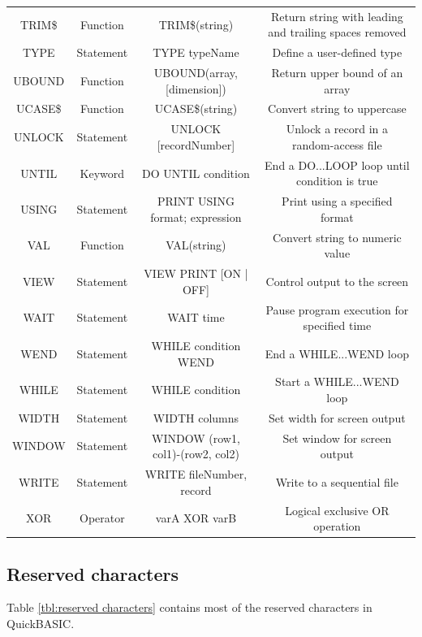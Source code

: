 \documentclass[10pt, reqno]{exam}
\begin{document}
{\begin{longtable}{|c|c|c|c|}
    TRIM\$ & Function & TRIM\$(string) & Return string with leading and trailing spaces removed \\
    TYPE & Statement & TYPE typeName & Define a user-defined type \\
    UBOUND & Function & UBOUND(array, [dimension]) & Return upper bound of an array \\
    UCASE\$ & Function & UCASE\$(string) & Convert string to uppercase \\
    UNLOCK & Statement & UNLOCK [recordNumber] & Unlock a record in a random-access file \\
    UNTIL & Keyword & DO UNTIL condition & End a DO...LOOP loop until condition is true \\
    USING & Statement & PRINT USING format; expression & Print using a specified format \\
    VAL & Function & VAL(string) & Convert string to numeric value \\
    VIEW & Statement & VIEW PRINT [ON | OFF] & Control output to the screen \\
    WAIT & Statement & WAIT time & Pause program execution for specified time \\
    WEND & Statement & WHILE condition WEND & End a WHILE...WEND loop \\
    WHILE & Statement & WHILE condition & Start a WHILE...WEND loop \\
    WIDTH & Statement & WIDTH columns & Set width for screen output \\
    WINDOW & Statement & WINDOW (row1, col1)-(row2, col2) & Set window for screen output \\
    WRITE & Statement & WRITE fileNumber, record & Write to a sequential file \\
    XOR & Operator & varA XOR varB & Logical exclusive OR operation \\
    \hline
\end{longtable}
}

\pagebreak

\subsection{Reserved characters}

Table \ref{tbl:reserved characters} contains most of the reserved characters in QuickBASIC. \par
\end{document}
